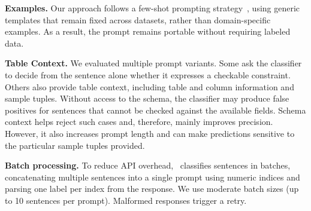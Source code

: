 \smallskip\noindent\textbf{Examples.} Our approach follows a \subs{ }{}few-shot prompting strategy~\cite{brown2020language}, using generic templates that remain fixed across datasets, rather than domain-specific examples. As a result, the prompt remains portable without requiring labeled data.




\smallskip\noindent\textbf{Table Context.}
We evaluated multiple prompt variants. 
Some ask the classifier to decide from the sentence alone whether it expresses a checkable constraint.
Others also provide table context, including table and column information and sample tuples. Without access to the schema, the classifier may
produce false positives for sentences that cannot be checked against the
available fields. Schema context helps reject such cases and, therefore, mainly improves precision. 
However, it also increases prompt length and can make predictions sensitive to the particular sample tuples provided.

\smallskip\noindent\textbf{Batch processing.}
To reduce API overhead, \system\ classifies sentences in batches, concatenating 
multiple sentences into a single prompt using numeric indices and parsing one 
label per index from the response. We use moderate batch sizes (up to 10 sentences 
per prompt). Malformed responses trigger a retry.











